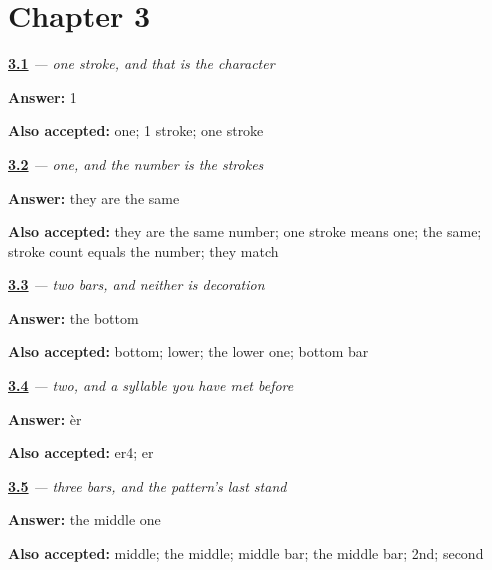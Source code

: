 \section*{Chapter 3}

\noindent\begin{minipage}[t]{\linewidth}
\raggedright
\hyperlink{review-ZH-W03-yi-strokes}{\textbf{3.1}} \emph{ — one stroke, and that is the character}\par
\small \textbf{Answer:} 1\par
\footnotesize \textbf{Also accepted:} one; 1 stroke; one stroke
\end{minipage}\par\medskip

\noindent\begin{minipage}[t]{\linewidth}
\raggedright
\hyperlink{review-ZH-C03-yi-count}{\textbf{3.2}} \emph{ — one, and the number is the strokes}\par
\small \textbf{Answer:} they are the same\par
\footnotesize \textbf{Also accepted:} they are the same number; one stroke means one; the same; stroke count equals the number; they match
\end{minipage}\par\medskip

\noindent\begin{minipage}[t]{\linewidth}
\raggedright
\hyperlink{review-ZH-W03-er-longer}{\textbf{3.3}} \emph{ — two bars, and neither is decoration}\par
\small \textbf{Answer:} the bottom\par
\footnotesize \textbf{Also accepted:} bottom; lower; the lower one; bottom bar
\end{minipage}\par\medskip

\noindent\begin{minipage}[t]{\linewidth}
\raggedright
\hyperlink{review-ZH-C03-er-tone}{\textbf{3.4}} \emph{ — two, and a syllable you have met before}\par
\small \textbf{Answer:} èr\par
\footnotesize \textbf{Also accepted:} er4; er
\end{minipage}\par\medskip

\noindent\begin{minipage}[t]{\linewidth}
\raggedright
\hyperlink{review-ZH-W03-san-middle}{\textbf{3.5}} \emph{ — three bars, and the pattern's last stand}\par
\small \textbf{Answer:} the middle one\par
\footnotesize \textbf{Also accepted:} middle; the middle; middle bar; the middle bar; 2nd; second
\end{minipage}\par\medskip

